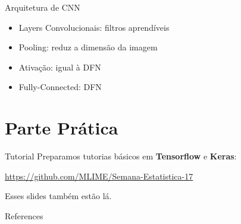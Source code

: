 \documentclass[10pt]{beamer}
\begin{document}
\begin{frame}[fragile]{Arquitetura de CNN}
\begin{center}

\end{center}
\begin{itemize}
	\item Layers Convolucionais: filtros aprendíveis
    \vspace{1em}
    \item Pooling: reduz a dimensão da imagem
    \vspace{1em}
    \item Ativação: igual à DFN
    \vspace{1em}
    \item Fully-Connected: DFN 
\end{itemize}
\end{frame}

\section{Parte Prática}

\begin{frame}{Tutorial}
Preparamos tutorias básicos em \textbf{Tensorflow} e \textbf{Keras}:
\vspace{0.3cm}
\begin{center}
\url{https://github.com/MLIME/Semana-Estatistica-17}
\end{center}

\vspace{0.3cm}

\alert{Esses slides também estão lá.}

\end{frame}

\begin{frame}[allowframebreaks]{References}

  
  

\end{frame}
\end{document}
